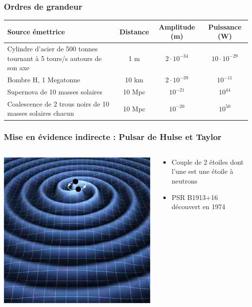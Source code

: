 \documentclass{beamer}
\begin{document}
\begin{frame}
	\frametitle{Ordres de grandeur}
	\begin{tabular}{|m{3.5cm}|c|c|c|}
		\hline
		Source émettrice &
		Distance &
		Amplitude (m) &
		Puissance (W)\\\hline
		Cylindre d'acier de 500 tonnes tournant à 5 tours/s autours de son axe & 1 m & 
		$2 \cdot 10^{-34}$ & $10 \cdot 10^{-29}$\\\hline
		Bombre H, 1 Megatonne & 10 km & $2 \cdot 10^{-39}$ & $10^{-11}$\\\hline
		Supernova de 10 masses solaires & 10 Mpc & $10^{-21}$ & $10^{44}$\\\hline
		Coalescence de 2 trous noirs de 10 masses solaires chacun & 10 Mpc & $10^{-20}$ & $10^{50}$\\\hline
	\end{tabular}
\end{frame}


\begin{frame}
	\frametitle{Mise en évidence indirecte : Pulsar de Hulse et Taylor}
	\begin{columns}
	\begin{column}{0.5\textwidth}
		\includegraphics[scale=0.2]{Docs/pulsar_binaire.jpeg}
	\end{column}
	\begin{column}{0.5\textwidth}
	\begin{itemize}
		\item Couple de 2 étoiles dont l'une est une étoile à neutrons
		\item PSR B1913+16 découvert en 1974
	\end{itemize}
	\end{column}
	\end{columns}
\end{frame}
\end{document}
